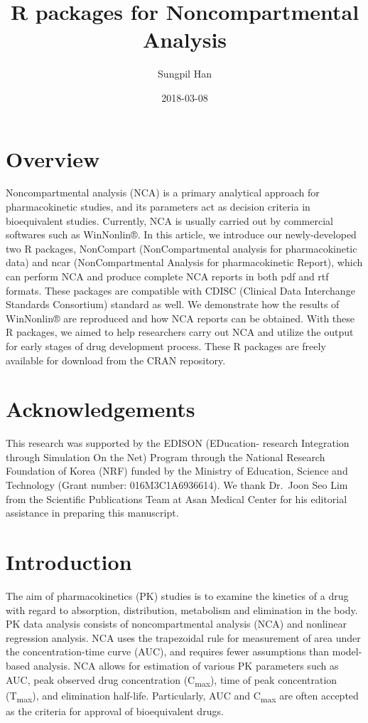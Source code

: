 \documentclass[12pt,]{krantz}
\title{R packages for Noncompartmental Analysis}
\author{Sungpil Han}
\date{2018-03-08}
\theoremstyle{definition}
\theoremstyle{definition}
\theoremstyle{definition}
\theoremstyle{remark}
\begin{document}
\maketitle

{
\hypersetup{linkcolor=black}
\setcounter{tocdepth}{2}
\tableofcontents
}
\listoftables
\listoffigures
\chapter*{Overview}\label{overview}


Noncompartmental analysis (NCA) is a primary analytical approach for
pharmacokinetic studies, and its parameters act as decision criteria in
bioequivalent studies. Currently, NCA is usually carried out by
commercial softwares such as WinNonlin®. In this article, we introduce
our newly-developed two R packages, NonCompart (NonCompartmental
analysis for pharmacokinetic data) and ncar (NonCompartmental Analysis
for pharmacokinetic Report), which can perform NCA and produce complete
NCA reports in both pdf and rtf formats. These packages are compatible
with CDISC (Clinical Data Interchange Standards Consortium) standard as
well. We demonstrate how the results of WinNonlin® are reproduced and
how NCA reports can be obtained. With these R packages, we aimed to help
researchers carry out NCA and utilize the output for early stages of
drug development process. These R packages are freely available for
download from the CRAN repository.

\chapter*{Acknowledgements}\label{acknowledgements}


This research was supported by the EDISON (EDucation- research
Integration through Simulation On the Net) Program through the National
Research Foundation of Korea (NRF) funded by the Ministry of Education,
Science and Technology (Grant number: 016M3C1A6936614). We thank
Dr.~Joon Seo Lim from the Scientific Publications Team at Asan Medical
Center for his editorial assistance in preparing this manuscript.

\mainmatter

\chapter{Introduction}\label{introduction}

The aim of pharmacokinetics (PK) studies is to examine the kinetics of a
drug with regard to absorption, distribution, metabolism and elimination
in the body. PK data analysis consists of noncompartmental analysis
(NCA) and nonlinear regression analysis. \citep{acharya, gab} NCA uses
the trapezoidal rule for measurement of area under the
concentration-time curve (AUC), and requires fewer assumptions than
model-based analysis. \citep{gab} NCA allows for estimation of various
PK parameters such as AUC, peak observed drug concentration
(C\textsubscript{max}), time of peak concentration
(T\textsubscript{max}), and elimination half-life. Particularly, AUC and
C\textsubscript{max} are often accepted as the criteria for approval of
bioequivalent drugs.
\end{document}
